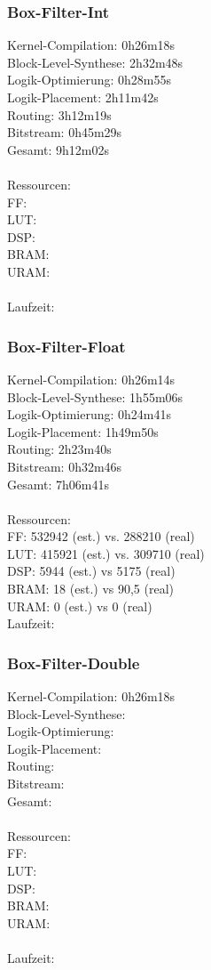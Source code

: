 \subsubsection{Box-Filter-Int}

Kernel-Compilation:     0h26m18s\\
Block-Level-Synthese:   2h32m48s\\
Logik-Optimierung:      0h28m55s\\
Logik-Placement:        2h11m42s\\ 
Routing:                3h12m19s\\
Bitstream:              0h45m29s\\
Gesamt:                 9h12m02s\\
\\
Ressourcen:\\
FF:\\
LUT:\\
DSP:\\
BRAM:\\
URAM:\\
\\
Laufzeit:

\subsubsection{Box-Filter-Float}

Kernel-Compilation:     0h26m14s\\
Block-Level-Synthese:   1h55m06s\\
Logik-Optimierung:      0h24m41s\\
Logik-Placement:        1h49m50s\\
Routing:                2h23m40s\\
Bitstream:              0h32m46s\\
Gesamt:                 7h06m41s\\
\\
Ressourcen:\\ 
FF: 532942 (est.) vs. 288210 (real)\\
LUT: 415921 (est.) vs. 309710 (real)\\
DSP: 5944 (est.) vs 5175 (real)\\
BRAM: 18 (est.) vs 90,5 (real)\\
URAM: 0 (est.) vs 0 (real)
\\
Laufzeit:

\subsubsection{Box-Filter-Double}

Kernel-Compilation:     0h26m18s\\
Block-Level-Synthese:   \\
Logik-Optimierung:      \\
Logik-Placement:        \\ 
Routing:                \\
Bitstream:              \\
Gesamt:                 \\
\\
Ressourcen:\\
FF:\\
LUT:\\
DSP:\\
BRAM:\\
URAM:\\
\\
Laufzeit:

